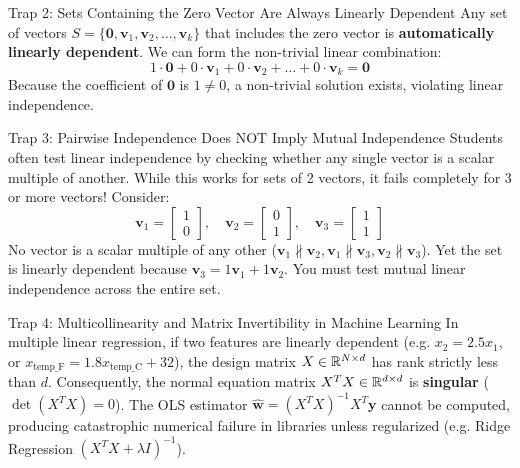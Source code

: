 \begin{trapbox}{Trap 2: Sets Containing the Zero Vector Are Always Linearly Dependent}
Any set of vectors $S = \{\mathbf{0}, \mathbf{v}_1, \mathbf{v}_2, \dots, \mathbf{v}_k\}$ that includes the zero vector is \textbf{automatically linearly dependent}.
We can form the non-trivial linear combination:
\begin{equation}
1 \cdot \mathbf{0} + 0 \cdot \mathbf{v}_1 + 0 \cdot \mathbf{v}_2 + \dots + 0 \cdot \mathbf{v}_k = \mathbf{0}
\end{equation}
Because the coefficient of $\mathbf{0}$ is $1 \neq 0$, a non-trivial solution exists, violating linear independence.
\end{trapbox}

\begin{trapbox}{Trap 3: Pairwise Independence Does NOT Imply Mutual Independence}
Students often test linear independence by checking whether any single vector is a scalar multiple of another. While this works for sets of 2 vectors, it fails completely for 3 or more vectors!
Consider:
\begin{equation}
\mathbf{v}_1 = \begin{bmatrix} 1 \\ 0 \end{bmatrix}, \quad \mathbf{v}_2 = \begin{bmatrix} 0 \\ 1 \end{bmatrix}, \quad \mathbf{v}_3 = \begin{bmatrix} 1 \\ 1 \end{bmatrix}
\end{equation}
No vector is a scalar multiple of any other ($\mathbf{v}_1 \nparallel \mathbf{v}_2, \mathbf{v}_1 \nparallel \mathbf{v}_3, \mathbf{v}_2 \nparallel \mathbf{v}_3$). Yet the set is linearly dependent because $\mathbf{v}_3 = 1\mathbf{v}_1 + 1\mathbf{v}_2$. You must test mutual linear independence across the entire set.
\end{trapbox}

\begin{trapbox}{Trap 4: Multicollinearity and Matrix Invertibility in Machine Learning}
In multiple linear regression, if two features are linearly dependent (e.g. $x_2 = 2.5 x_1$, or $x_{\text{temp\_F}} = 1.8 x_{\text{temp\_C}} + 32$), the design matrix $X \in \mathbb{R}^{N \times d}$ has rank strictly less than $d$.
Consequently, the normal equation matrix $X^T X \in \mathbb{R}^{d \times d}$ is \textbf{singular} ($\det(X^T X) = 0$). 
The OLS estimator $\hat{\mathbf{w}} = (X^T X)^{-1} X^T \mathbf{y}$ cannot be computed, producing catastrophic numerical failure in libraries unless regularized (e.g. Ridge Regression $(X^T X + \lambda I)^{-1}$).
\end{trapbox}

